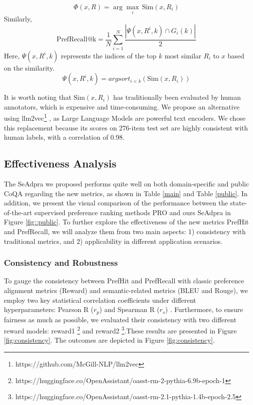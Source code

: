 \begin{equation}
   \Phi (x,R) =\arg \max_{i} \, \text{Sim}(x, R_i)
   \label{eq::sim}
\end{equation}
Similarly,
\begin{equation}
    \text{PrefRecall@k} = \frac{1}{N} \sum_{i=1}^{N} \frac{\left| \Psi (x,R^i,k) \cap G_i(k) \right|}{2}
\end{equation}
Here, \(\Psi(x, R^i, k)\) represents the indices of the top \(k\) most similar \(R_i\) to \(x\) based on the similarity.
\begin{equation}
   \Psi(x, R^i, k) = argsort_{i<k} \left( \text{Sim}(x, R_i) \right)
\end{equation}

It is worth noting that \(\text{Sim}(x, R_i)\) has traditionally been evaluated by human annotators, which is expensive and time-consuming. We propose an alternative using llm2vec\footnote{https://github.com/McGill-NLP/llm2vec} \cite{behnamghader2024llm2vec}, as Large Language Models are powerful text encoders. We chose this replacement because its scores on 276-item test set are highly consistent with human labels, with a correlation of 0.98.


\subsection{Effectiveness Analysis}
\label{metric::ana}
The SeAdpra we proposed performs quite well on both domain-specific and public CoQA regarding the new metrics, as shown in Table \ref{main} and Table \ref{public}. 
In addition, we present the visual comparison of the performance between the state-of-the-art supervised preference ranking methods PRO and ours SeAdpra in Figure \ref{fig::public}.
To further explore the effectiveness of the new metrics PrefHit and PrefRecall, we will analyze them from two main aspects: 1) consistency with traditional metrics, and 2) applicability in different application scenarios.

\subsubsection{Consistency and Robustness}
To gauge the consistency between PrefHit and PrefRecall with classic preference alignment metrics (Reward) and semantic-related metrics (BLEU and Rouge), we employ two key statistical correlation coefficients under different hyperparameters: Pearson R (\(r_p\)) \cite{bravais1844analyse} and Spearman R (\(r_s\)) \cite{pranklin1974introduction}. 
Furthermore, to ensure fairness as much as possible, we evaluated their consistency with two different reward models: reward1 \footnote{https://huggingface.co/OpenAssistant/oasst-rm-2-pythia-6.9b-epoch-1} and reward2 \footnote{https://huggingface.co/OpenAssistant/oasst-rm-2.1-pythia-1.4b-epoch-2.5}.These results are presented in Figure \ref{fig:consistency}.
The outcomes are depicted in Figure \ref{fig:consistency}.

